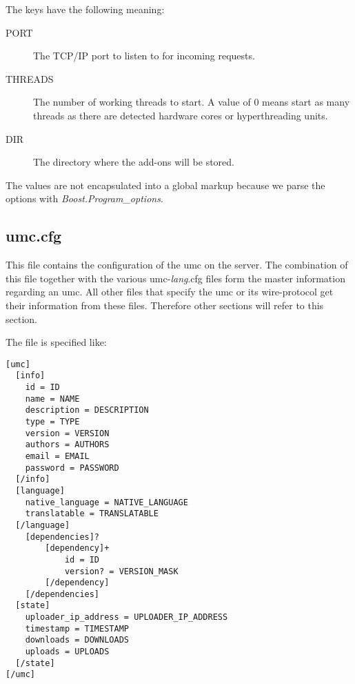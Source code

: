 The keys have the following meaning:
\begin{description}
\item[PORT]
	The TCP/IP port to listen to for incoming requests.

\item[THREADS]
	The number of working threads to start. A value of $0$ means start as
	many threads as there are detected hardware cores or hyperthreading units.

\item[DIR]
  The directory where the add-ons will be stored.
\end{description}

The values are not encapsulated into a global markup because we parse the options with \textit{Boost.Program\_options}.

\subsection{umc.cfg}
\label{section:communication_protocol:server:umc.cfg}

This file contains the configuration of the umc on the server. The
combination of this file together with the various
\mbox{umc-\emph{lang}.cfg} files form the master information regarding an
umc. All other files that specify the umc or its wire-protocol get their
information from these files. Therefore other sections will refer to this
section.

The file is specified like:
\begin{lstlisting}
[umc]
  [info]
    id = ID
    name = NAME
    description = DESCRIPTION
    type = TYPE
    version = VERSION
    authors = AUTHORS
    email = EMAIL
    password = PASSWORD
  [/info]
  [language]
    native_language = NATIVE_LANGUAGE
    translatable = TRANSLATABLE
  [/language]
	[dependencies]?
		[dependency]+
			id = ID
			version? = VERSION_MASK
		[/dependency]
	[/dependencies]
  [state]
    uploader_ip_address = UPLOADER_IP_ADDRESS
    timestamp = TIMESTAMP
    downloads = DOWNLOADS
    uploads = UPLOADS
  [/state]
[/umc]
\end{lstlisting}


